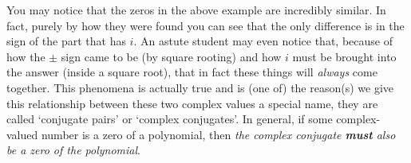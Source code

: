 \documentclass{ximeraXloud}
\begin{document}
    
    You may notice that the zeros in the above example are incredibly similar. In fact, purely by how they were found you can see that the only difference is in the sign of the part that has $i$. An astute student may even notice that, because of how the $\pm$ sign came to be (by square rooting) and how $i$ must be brought into the answer (inside a square root), that in fact these things will \textit{always} come together. This phenomena is actually true and is (one of) the reason(s) we give this relationship between these two complex values a special name, they are called `conjugate pairs' or `complex conjugates'. In general, if some complex-valued number is a zero of a polynomial, then \textit{the complex conjugate \textbf{must} also be a zero of the polynomial}.
\end{document}
